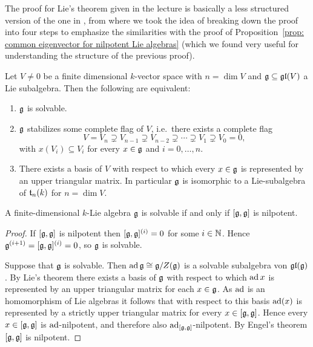 \begin{rem}
 The proof for Lie’s theorem given in the lecture is basically a less structured version of the one in \cite[\S 4.1]{Humphreys}, from where we took the idea of breaking down the proof into four steps to emphasize the similarities with the proof of Proposition~\ref{prop: common eigenvector for nilpotent Lie algebras} (which we found very useful for understanding the structure of the previous proof).
\end{rem}


\begin{prop}\label{prop: common eigenvector for solvable Lie algebras}
 Let $V \neq 0$ be a finite dimensional $k$-vector space with $n = \dim V$ and $\mathfrak{g} \subseteq \mathfrak{gl}(V)$ a Lie subalgebra. Then the following are equivalent:
 \begin{enumerate}[leftmargin=*]
  \item
   $\mathfrak{g}$ is solvable.
  \item
   $\mathfrak{g}$ stabilizes some complete flag of $V$, i.e.\ there exists a complete flag
   \[
    V = V_n \supsetneq V_{n-1} \supsetneq V_{n-2} \supsetneq \dotsb \supsetneq V_1 \supsetneq V_0 = 0,
   \]
   with $x(V_i) \subseteq V_i$ for every $x \in \mathfrak{g}$ and $i = 0, \dotsc, n$.
  \item
   There exists a basis of $V$ with respect to which every $x \in \mathfrak{g}$ is represented by an upper triangular matrix. In particular $\mathfrak{g}$ is isomorphic to a Lie-subalgebra of $\mathfrak{t}_n(k)$ for $n = \dim V$.
 \end{enumerate}
\end{prop}


\begin{cor}
 A finite-dimensional $k$-Lie algebra $\mathfrak{g}$ is solvable if and only if $[\mathfrak{g},\mathfrak{g}]$ is nilpotent.
\end{cor}
\begin{proof}
 If $[\mathfrak{g},\mathfrak{g}]$ is nilpotent then $[\mathfrak{g},\mathfrak{g}]^{(i)} = 0$ for some $i \in \mathbb{N}$. Hence $\mathfrak{g}^{(i+1)} = [\mathfrak{g},\mathfrak{g}]^{(i)} = 0$, so $\mathfrak{g}$ is solvable.
 
 Suppose that $\mathfrak{g}$ is solvable. Then $\operatorname{ad} \mathfrak{g} \cong \mathfrak{g}/Z(\mathfrak{g})$ is a solvable subalgebra von $\mathfrak{gl}(\mathfrak{g})$. By Lie’s theorem there exists a basis of $\mathfrak{g}$ with respect to which $\operatorname{ad} x$ is represented by an upper triangular matrix for each $x \in \mathfrak{g}$. As $\operatorname{ad}$ is an homomorphism of Lie algebras it follows that with respect to this basis $\operatorname{ad}(x)$ is represented by a strictly upper triangular matrix for every $x \in [\mathfrak{g},\mathfrak{g}]$. Hence every $x \in [\mathfrak{g},\mathfrak{g}]$ is $\operatorname{ad}$-nilpotent, and therefore also $\operatorname{ad}_{[\mathfrak{g},\mathfrak{g}]}$-nilpotent. By Engel’s theorem $[\mathfrak{g},\mathfrak{g}]$ is nilpotent.
\end{proof}


